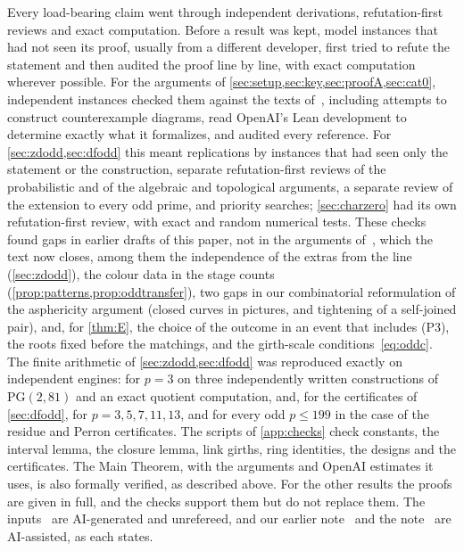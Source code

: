 \documentclass[11pt]{article}
\theoremstyle{definition}
\theoremstyle{plain}
\newcommand{\PG}{\mathrm{PG}}
\begin{document}
Every load-bearing claim went through independent derivations, refutation-first reviews and exact computation. Before a result was kept, model instances that had not seen its proof, usually from a different developer, first tried to refute the statement and then audited the proof line by line, with exact computation wherever possible. For the arguments of \cref{sec:setup,sec:key,sec:proofA,sec:cat0}, independent instances checked them against the texts of~\cite{OAI196,OAI197a,OAI197b}, including attempts to construct counterexample diagrams, read OpenAI's Lean development to determine exactly what it formalizes, and audited every reference. For \cref{sec:zdodd,sec:dfodd} this meant replications by instances that had seen only the statement or the construction, separate refutation-first reviews of the probabilistic and of the algebraic and topological arguments, a separate review of the extension to every odd prime, and priority searches; \cref{sec:charzero} had its own refutation-first review, with exact and random numerical tests. These checks found gaps in earlier drafts of this paper, not in the arguments of~\cite{OAI196,OAI197a}, which the text now closes, among them the independence of the extras from the line (\cref{sec:zdodd}), the colour data in the stage counts (\cref{prop:patterns,prop:oddtransfer}), two gaps in our combinatorial reformulation of the asphericity argument (closed curves in pictures, and tightening of a self-joined pair), and, for \cref{thm:E}, the choice of the outcome in an event that includes (P3), the roots fixed before the matchings, and the girth-scale conditions~\eqref{eq:oddc}. The finite arithmetic of \cref{sec:zdodd,sec:dfodd} was reproduced exactly on independent engines: for $p=3$ on three independently written constructions of $\PG(2,81)$ and an exact quotient computation, and, for the certificates of \cref{sec:dfodd}, for $p=3,5,7,11,13$, and for every odd $p\le199$ in the case of the residue and Perron certificates. The scripts of \cref{app:checks} check constants, the interval lemma, the closure lemma, link girths, ring identities, the designs and the certificates. The Main Theorem, with the arguments and OpenAI estimates it uses, is also formally verified, as described above. For the other results the proofs are given in full, and the checks support them but do not replace them. The inputs~\cite{OAI196,OAI197a,OAI197b,OAI252,OAI257} are AI-generated and unrefereed, and our earlier note~\cite{DouglasMghirbi2026} and the note~\cite{SandhuThom2026} are AI-assisted, as each states.
\end{document}
